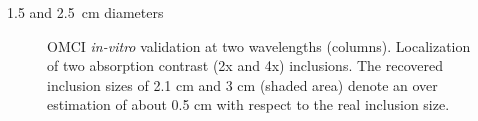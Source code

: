1.5 and 2.5~cm diameters

\begin{figure}[]
    \begin{center}
    \end{center}
    \caption{OMCI \textit{in-vitro} validation at two wavelengths (columns). Localization of two absorption contrast (2x and 4x) inclusions. The recovered inclusion sizes of 2.1 cm and 3 cm (shaded area) denote an over estimation of about 0.5 cm with respect to the real inclusion size.} 
    \label{fig:PhantomResults}
\end{figure} 



